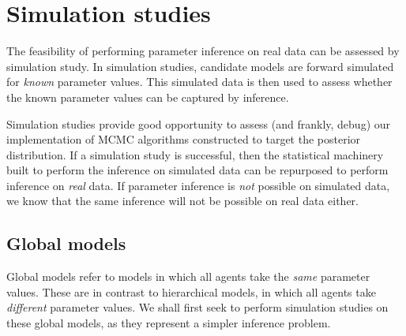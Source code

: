 \graphicspath{{fig/sim_studies/}%
              {fig/sim_studies/r/}%
              {fig/sim_studies/power/}%
              {fig/sim_studies/gauss/}%
              {fig/sim_studies/top/}}

\chapter{Simulation studies}
\label{cha:sim_studies}

The feasibility of performing parameter inference on real data can be assessed
by simulation study. In simulation studies, candidate models are forward
simulated for \emph{known} parameter values. This simulated data is then used
to assess whether the known parameter values can be captured by inference.

Simulation studies provide good opportunity to assess (and frankly, debug) our
implementation of MCMC algorithms constructed to target the posterior
distribution. If a simulation study is successful, then the statistical
machinery built to perform the inference on simulated data can be repurposed
to perform inference on \emph{real} data. If parameter inference is \emph{not}
possible on simulated data, we know that the same inference will not be
possible on real data either.

\section{Global models}
\label{sec:global_models}

Global models refer to models in which all agents take the \emph{same}
parameter values. These are in contrast to hierarchical models, in which all
agents take \emph{different} parameter values. We shall first seek to perform
simulation studies on these global models, as they represent a simpler
inference problem.

